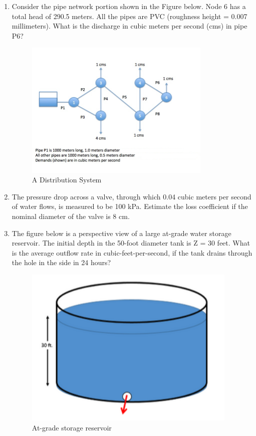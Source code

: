 \documentclass[12pt]{article}
\begin{document}
\begin{enumerate}
\item Consider the pipe network portion shown in the Figure below. Node 6 has a total head of 290.5 meters. All the pipes are PVC (roughness height = 0.007 millimeters).  What is the discharge in cubic meters per second (cms) in pipe P6?

\begin{figure}[htbp] %
   \centering
  \includegraphics[width=3.5in]{2018Pipeline2.jpg} 
   \caption{A Distribution System}
   \label{fig:placeholder5}
\end{figure}

\item The pressure drop across a valve, through which 0.04 cubic meters per second of water flows, is measured to be 100 kPa. Estimate the loss coefficient if the nominal diameter of the valve is 8 cm. \\

\clearpage

\item The figure below is a perspective view of a large at-grade water storage reservoir. The initial depth in the 50-foot diameter tank is  Z = 30 feet. What is the average outflow rate in cubic-feet-per-second, if the tank drains through the hole in the side in 24 hours? 

\begin{figure}[htbp] %
   \centering
  \includegraphics[width=4in]{StorageTank.png} 
   \caption{At-grade storage reservoir}
   \label{fig:placeholder6}
\end{figure}


\end{enumerate}
\end{document}
